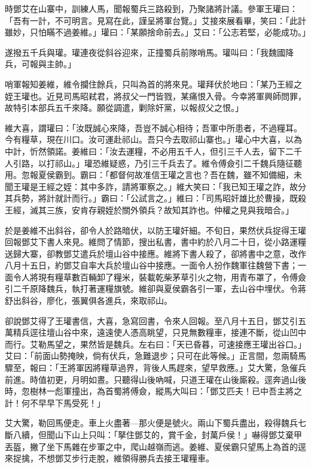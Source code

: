 時鄧艾在山寨中，訓練人馬，聞報蜀兵三路殺到，乃聚諸將計議。參軍王瓘曰：「吾有一計，不可明言。見寫在此，謹呈將軍台覽。」艾接來展看畢，笑曰：「此計雖妙，只怕瞞不過姜維。」瓘曰：「某願捨命前去。」艾曰：「公志若堅，必能成功。」

遂撥五千兵與瓘。瓘連夜從斜谷迎來，正撞蜀兵前隊哨馬。瓘叫曰：「我魏國降兵，可報與主帥。」

哨軍報知姜維，維令攔住餘兵，只叫為首的將來見。瓘拜伏於地曰：「某乃王經之姪王瓘也。近見司馬昭弒君，將叔父一門皆戮，某痛恨入骨。今幸將軍興師問罪，故特引本部兵五千來降。願從調遣，剿除奸黨，以報叔父之恨。」

維大喜，謂瓘曰：「汝既誠心來降，吾豈不誠心相待；吾軍中所患者，不過糧耳。今有糧草，現在川口。汝可運赴祁山。吾只今去取祁山寨也。」瓘心中大喜，以為中計，忻然領諾。姜維曰：「汝去運糧，不必用五千人，但引三千人去，留下二千人引路，以打祁山。」瓘恐維疑惑，乃引三千兵去了。維令傅僉引二千魏兵隨征聽用。忽報夏侯霸到。霸曰：「都督何故准信王瓘之言也？吾在魏，雖不知備細，未聞王瓘是王經之姪：其中多詐，請將軍察之。」維大笑曰：「我已知王瓘之詐，故分其兵勢，將計就計而行。」霸曰：「公試言之。」維曰：「司馬昭奸雄比於曹操，既殺王經，滅其三族，安肯存親姪於關外領兵？故知其詐也。仲權之見與我暗合。」

於是姜維不出斜谷，卻令人於路暗伏，以防王瓘奸細。不旬日，果然伏兵捉得王瓘回報鄧艾下書人來見。維問了情節，搜出私書，書中約於八月二十日，從小路運糧送歸大寨，卻教鄧艾遣兵於壇山谷中接應。維將下書人殺了，卻將書中之意，改作八月十五日，約鄧艾自率大兵於壇山谷中接應。一面令人扮作魏軍往魏營下書；一面令人將現有糧草數百輛卸了糧米，裝載乾柴茅草引火之物，用青布罩了，令傅僉引二千原降魏兵，執打著運糧旗號。維卻與夏侯霸各引一軍，去山谷中埋伏。令蔣舒出斜谷，廖化，張翼俱各進兵，來取祁山。

卻說鄧艾得了王瓘書信，大喜，急寫回書，令來人回報。至八月十五日，鄧艾引五萬精兵逕往壇山谷中來，遠遠使人憑高眺望，只見無數糧車，接連不斷，從山凹中而行。艾勒馬望之，果然皆是魏兵。左右曰：「天已昏暮，可速接應王瓘出谷口。」艾曰：「前面山勢掩映，倘有伏兵，急難退步；只可在此等候。」正言間，忽兩騎馬驟至，報曰：「王將軍因將糧草過界，背後人馬趕來，望早救應。」艾大驚，急催兵前進。時值初更，月明如晝。只聽得山後吶喊，只道王瓘在山後廝殺。逕奔過山後時，忽樹林一彪軍撞出，為首蜀將傅僉，縱馬大叫曰：「鄧艾匹夫！已中吾主將之計！何不早早下馬受死！」

艾大驚，勒回馬便走。車上火盡著—那火便是號火。兩山下蜀兵盡出，殺得魏兵七斷八續，但聞山下山上只叫：「拏住鄧艾的，賞千金，封萬戶侯！」嚇得鄧艾棄甲丟盔，撇了坐下馬雜在步軍之中，爬山越嶺而逃。姜維、夏侯霸只望馬上為首的逕來捉擒，不想鄧艾步行走脫，維領得勝兵去接王瓘糧車。

